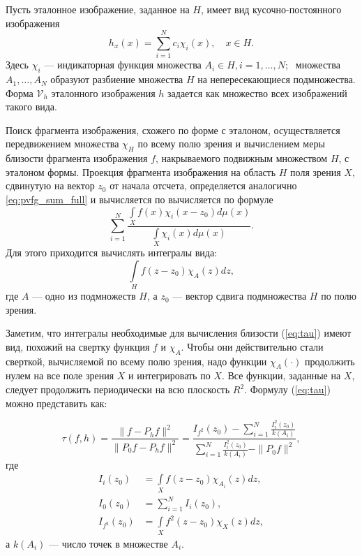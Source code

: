 Пусть эталонное изображение, заданное на $H$, имеет вид кусочно-постоянного изображения
\begin{equation*}
h_x(x) = \sum\limits_{i=1}^{N}c_i\chi_i(x),\quad x \in H.
\end{equation*}
Здесь $\chi_i$ --- индикаторная функция множества $A_i \in H, i = 1, \dots , N; \;$ множества $A_1, \dots ,A_N$ образуют разбиение множества $H$ на непересекающиеся подмножества. Форма $\mathcal{V}_h$ эталонного изображения $h$ задается как множество всех изображений такого вида.


Поиск фрагмента изображения, схожего по форме с эталоном, осуществляется передвижением множества $\chi_H$ по всему полю зрения и вычислением меры близости фрагмента изображения $f$, накрываемого подвижным множеством $H$, с эталоном формы.
Проекция фрагмента изображения на область $H$ поля зрения $X$, сдвинутую на вектор $z_0$ от начала отсчета, определяется аналогично  \eqref{eq:pvfg_sum_full} и вычисляется  по  вычисляется по формуле
$$
\sum \limits_{i=1}^{N} \frac{\int \limits_X f(x)\chi_i(x-z_0)d\mu(x)}{\int \limits_X \chi_i(x)d\mu(x)}.
$$
Для этого приходится вычислять интегралы вида:
\begin{equation} \label{eq:convolution}
    \int\limits_H f(z-z_0)\chi_A(z)dz,
\end{equation}
где $A$ --- одно из подмножеств $H$, а $z_0$ --- вектор сдвига подмножества $H$ по полю зрения.


Заметим, что интегралы необходимые для вычисления близости (\ref{eq:tau}) имеют вид, похожий на свертку функция $f$ и $\chi_A$. Чтобы они действительно стали сверткой, вычисляемой по всему полю зрения, надо функции $\chi_A(\cdot)$ продолжить нулем на все поле зрения $X$ и интегрировать по $X$. Все функции, заданные на $X$, следует продолжить периодически на всю плоскость $R^2$. Формулу (\ref{eq:tau}) можно представить как:

\begin{samepage}

\begin{equation}
    \tau(f, h) = \frac{\|f - P_hf\|^2}{\|P_0f - P_hf\|^2} =
    \frac{ I_{f^2}(z_0) - \sum\limits_{i=1}^{N}\frac{I_i^2(z_0)}{k(A_i)} }
    { \sum\limits_{i=1}^{N}\frac{I_i^2(z_0)}{k(A_i)} - \|P_0f\|^2 },
\end{equation}
где
\begin{subequations}
\begin{align*}
    I_i(z_0)     & = \int\limits_X f(z-z_0)\chi_{A_i}(z)dz, \\
    I_0(z_0)     & = \sum_{i=1}^{N}I_i(z_0), \\
    I_{f^2}(z_0) & = \int\limits_X f^2(z-z_0)\chi_X(z)dz,
\end{align*}
\end{subequations}
а $k(A_i)$ --- число точек в множестве $A_i$.

\end{samepage}


